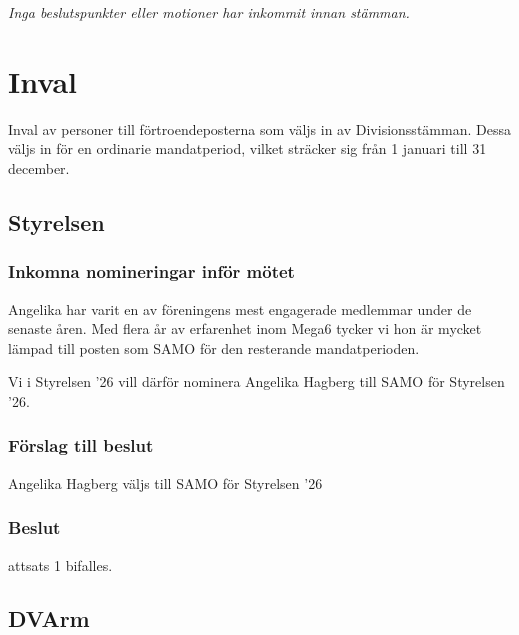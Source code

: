 \documentclass[protokoll]{dvd}
\begin{document}
\textit{Inga beslutspunkter eller motioner har inkommit innan stämman.}


\section{Inval}
Inval av personer till förtroendeposterna som väljs in av Divisionsstämman. Dessa väljs in för en ordinarie mandatperiod, vilket sträcker sig från 1 januari till 31 december.

\subsection{Styrelsen}
\subsubsection*{Inkomna nomineringar inför mötet}
Angelika har varit en av föreningens mest engagerade medlemmar under de senaste åren. Med flera år av erfarenhet inom Mega6 tycker vi hon är mycket lämpad till posten som SAMO för den resterande mandatperioden.

Vi i Styrelsen '26 vill därför nominera Angelika Hagberg till SAMO för Styrelsen '26. 

\subsubsection*{Förslag till beslut}
\begin{attsatser}
    \item Angelika Hagberg väljs till SAMO för Styrelsen '26
\end{attsatser}
\subsubsection*{Beslut} 
\begin{attsatser}
    \item attsats 1 bifalles.
\end{attsatser}

\subsection{DVArm}
\end{document}
